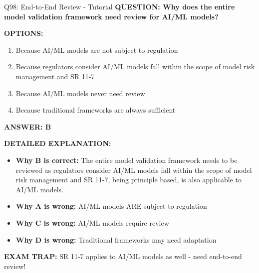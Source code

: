 \documentclass[8pt]{beamer}
\begin{document}
	\begin{frame}{Q98: End-to-End Review - Tutorial}
		\fontsize{6.5}{7.5}\selectfont
		\textbf{QUESTION: Why does the entire model validation framework need review for AI/ML models?}
		
		\vspace{0.1cm}
		\textbf{OPTIONS:}
		\begin{enumerate}
			\item Because AI/ML models are not subject to regulation
			\item Because regulators consider AI/ML models fall within the scope of model risk management and SR 11-7
			\item Because AI/ML models never need review
			\item Because traditional frameworks are always sufficient
		\end{enumerate}
		
		\vspace{0.1cm}
		\textcolor{myblue}{\textbf{ANSWER: B}}
		
		\vspace{0.1cm}
		\textbf{DETAILED EXPLANATION:}
		\begin{itemize}
			\item \textbf{Why B is correct:} The entire model validation framework needs to be reviewed as regulators consider AI/ML models fall within the scope of model risk management and SR 11-7, being principle based, is also applicable to AI/ML models.
			\item \textbf{Why A is wrong:} AI/ML models ARE subject to regulation
			\item \textbf{Why C is wrong:} AI/ML models require review
			\item \textbf{Why D is wrong:} Traditional frameworks may need adaptation
		\end{itemize}
		
		\textcolor{myred}{\textbf{EXAM TRAP:}} SR 11-7 applies to \textcolor{myblue}{AI/ML models as well} - need end-to-end review!
	\end{frame}
	
\end{document}
